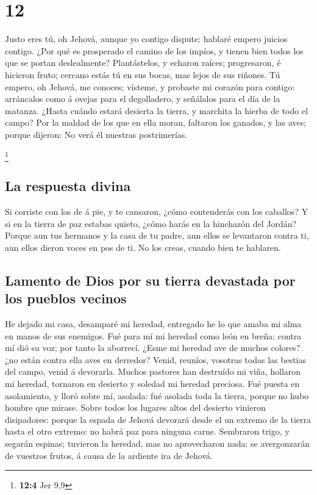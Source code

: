 \hypertarget{section-11}{%
\section{12}\label{section-11}}

 Justo eres tú, oh Jehová, aunque yo contigo dispute:
hablaré empero juicios contigo. ¿Por qué es prosperado el camino de los
impíos, y tienen bien todos los que se portan deslealmente? 
Plantástelos, y echaron raíces; progresaron, é hicieron fruto; cercano
estás tú en sus bocas, mas lejos de sus riñones.  Tú empero,
oh Jehová, me conoces; vísteme, y probaste mi corazón para contigo:
arráncalos como á ovejas para el degolladero, y señálalos para el día de
la matanza.  ¿Hasta cuándo estará desierta la tierra, y
marchita la hierba de todo el campo? Por la maldad de los que en ella
moran, faltaron los ganados, y las aves; porque dijeron: No verá él
nuestras postrimerías.

\footnote{\textbf{12:4} Jer 9,9}

\hypertarget{la-respuesta-divina}{%
\subsection{La respuesta divina}\label{la-respuesta-divina}}

 Si corriste con los de á pie, y te cansaron, ¿cómo
contenderás con los caballos? Y si en la tierra de paz estabas quieto,
¿cómo harás en la hinchazón del Jordán?  Porque aun tus
hermanos y la casa de tu padre, aun ellos se levantaron contra ti, aun
ellos dieron voces en pos de ti. No los creas, cuando bien te hablaren.

\hypertarget{lamento-de-dios-por-su-tierra-devastada-por-los-pueblos-vecinos}{%
\subsection{Lamento de Dios por su tierra devastada por los pueblos
vecinos}\label{lamento-de-dios-por-su-tierra-devastada-por-los-pueblos-vecinos}}

 He dejado mi casa, desamparé mi heredad, entregado he lo
que amaba mi alma en manos de sus enemigos.  Fué para mí mi
heredad como león en breña: contra mí dió su voz; por tanto la aborrecí.
 ¿Esme mi heredad ave de muchos colores? ¿no están contra
ella aves en derredor? Venid, reuníos, vosotras todas las bestias del
campo, venid á devorarla.  Muchos pastores han destruído mi
viña, hollaron mi heredad, tornaron en desierto y soledad mi heredad
preciosa.  Fué puesta en asolamiento, y lloró sobre mí,
asolada: fué asolada toda la tierra, porque no hubo hombre que mirase.
 Sobre todos los lugares altos del desierto vinieron
disipadores: porque la espada de Jehová devorará desde el un extremo de
la tierra hasta el otro extremo: no habrá paz para ninguna carne.
 Sembraron trigo, y segarán espinas; tuvieron la heredad,
mas no aprovecharon nada: se avergonzarán de vuestros frutos, á causa de
la ardiente ira de Jehová.


